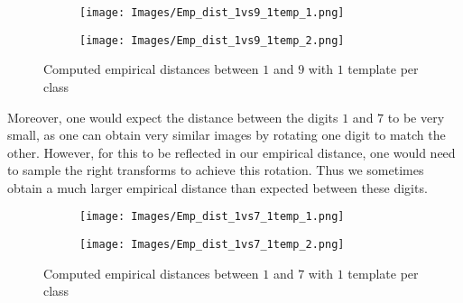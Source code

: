 \documentclass{article}
\theoremstyle{definition}
\theoremstyle{remark}
\theoremstyle{proposition}
\begin{document}
            \begin{figure} [H]
                \centering
                \begin{subfigure}{.5\textwidth}
                      \centering
                      \texttt{[image: Images/Emp\_dist\_1vs9\_1temp\_1.png]}
                \end{subfigure}%
                \begin{subfigure}{.5\textwidth}
                      \centering
                      \texttt{[image: Images/Emp\_dist\_1vs9\_1temp\_2.png]}
                \end{subfigure}
                \caption{Computed empirical distances between $1$ and $9$ with $1$ template per class}
                \label{1vs9_1t}
            \end{figure}


            Moreover, one would expect the distance between the digits $1$ and $7$ to be very small, as one can obtain very similar images by rotating one digit to match the other. However, for this to be reflected in our empirical distance, one would need to sample the right transforms to achieve this rotation. Thus we sometimes obtain a much larger empirical distance than expected between these digits. 

            \begin{figure}[H]
                \centering
                \begin{subfigure}{.5\textwidth}
                      \centering
                      \texttt{[image: Images/Emp\_dist\_1vs7\_1temp\_1.png]}
                \end{subfigure}%
                \begin{subfigure}{.5\textwidth}
                      \centering
                      \texttt{[image: Images/Emp\_dist\_1vs7\_1temp\_2.png]}
                \end{subfigure}
                \caption{Computed empirical distances between $1$ and $7$ with $1$ template per class}
            \end{figure}
\end{document}
